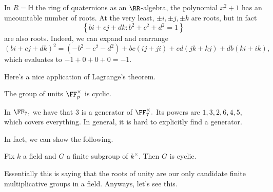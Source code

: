 \documentclass[../notes.tex]{subfiles}
\begin{document}
\begin{example}
	In $R=\mathbb H$ the ring of quaternions as an $\RR$-algebra, the polynomial $x^2+1$ has an uncountable number of roots. At the very least, $\pm i,\pm j,\pm k$ are roots, but in fact
	\[\left\{bi+cj+dk:b^2+c^2+d^2=1\right\}\]
	are also roots. Indeed, we can expand and rearrange
	\[(bi+cj+dk)^2=\left(-b^2-c^2-d^2\right)+bc(ij+ji)+cd(jk+kj)+db(ki+ik),\]
	which evaluates to $-1+0+0+0=-1.$
\end{example}
Here's a nice application of Lagrange's theorem.
\begin{theorem} \label{thm:primegen}
	The group of units $\FF_p^\times$ is cyclic.
\end{theorem}
\begin{example}
	In $\FF_7,$ we have that $3$ is a generator of $\FF_7^\times.$ Its powers are $1,3,2,6,4,5,$ which covers everything. In general, it is hard to explicitly find a generator.
\end{example}
In fact, we can show the following.
\begin{proposition}
	Fix $k$ a field and $G$ a finite subgroup of $k^\times.$ Then $G$ is cyclic.
\end{proposition}
Essentially this is saying that the roots of unity are our only candidate finite multiplicative groups in a field. Anyways, let's see this.
\end{document}
